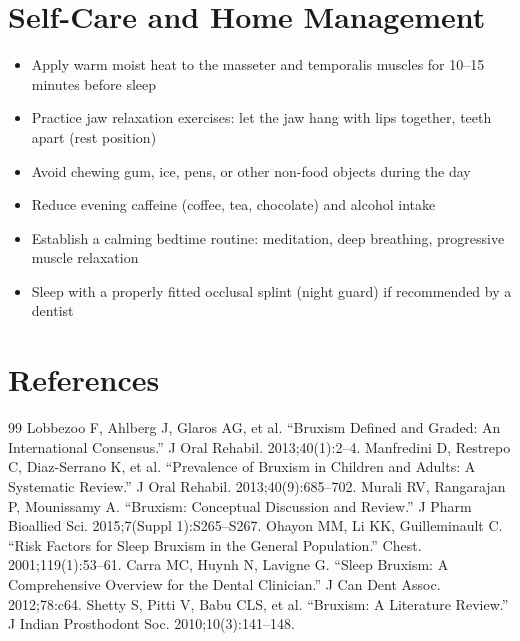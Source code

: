 \section*{Self-Care and Home Management}
\begin{itemize}
 \item Apply warm moist heat to the masseter and temporalis muscles for 10--15 minutes before sleep
 \item Practice jaw relaxation exercises: let the jaw hang with lips together, teeth apart (rest position)
 \item Avoid chewing gum, ice, pens, or other non-food objects during the day
 \item Reduce evening caffeine (coffee, tea, chocolate) and alcohol intake
 \item Establish a calming bedtime routine: meditation, deep breathing, progressive muscle relaxation
 \item Sleep with a properly fitted occlusal splint (night guard) if recommended by a dentist
\end{itemize}

\section*{References}
\begin{thebibliography}{99}
 Lobbezoo F, Ahlberg J, Glaros AG, et al. ``Bruxism Defined and Graded: An International Consensus.'' J Oral Rehabil. 2013;40(1):2--4.
 Manfredini D, Restrepo C, Diaz-Serrano K, et al. ``Prevalence of Bruxism in Children and Adults: A Systematic Review.'' J Oral Rehabil. 2013;40(9):685--702.
 Murali RV, Rangarajan P, Mounissamy A. ``Bruxism: Conceptual Discussion and Review.'' J Pharm Bioallied Sci. 2015;7(Suppl 1):S265--S267.
 Ohayon MM, Li KK, Guilleminault C. ``Risk Factors for Sleep Bruxism in the General Population.'' Chest. 2001;119(1):53--61.
 Carra MC, Huynh N, Lavigne G. ``Sleep Bruxism: A Comprehensive Overview for the Dental Clinician.'' J Can Dent Assoc. 2012;78:c64.
 Shetty S, Pitti V, Babu CLS, et al. ``Bruxism: A Literature Review.'' J Indian Prosthodont Soc. 2010;10(3):141--148.
\end{thebibliography}
